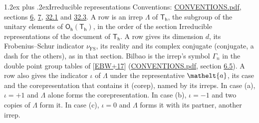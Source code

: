 \documentclass[10pt,a4paper]{article}
\makeatletter
\renewcommand\section{\@startsection{section}{1}{\z@}{-3ex plus -1ex minus -.2ex}%
  {1.2ex plus .2ex}{\normalfont\large\sffamily\bfseries\color{parttitle}}}
\numberwithin{equation}{section}
\newcommand{\eltfont}[1]{{\let\sigma\eltsigma\mathelt{#1}}}
\newcommand{\grp}[1]{\mathsf{#1}}
\newcommand{\elt}[1]{\eltfont{#1}}
\newcommand{\fsind}{\nu_{\mathrm{FS}}}
\makeatother
\begin{document}
\section{Irreducible representations}\label{s:irreps}
Conventions: \href{../../CONVENTIONS.pdf}{CONVENTIONS.pdf}, sections \href{../../../rotation/CONVENTIONS.pdf\#conv.6}{6}, \href{../../../rotation/CONVENTIONS.pdf\#conv.7}{7}, \href{../../CONVENTIONS.pdf\#conv.32.1}{32.1} and \href{../../CONVENTIONS.pdf\#conv.32.3}{32.3}.
\leavevmode\label{n:irrep.Delta}A row is an irrep $\Lambda$ of $\grp{T_{h}}$, the subgroup of the unitary elements of $\grp{O_{h}}(\grp{T_{h}})$, in the order of the section Irreducible representations of the document of \href{../../../rotation/data/pdf/Th.pdf}{$\grp{T_{h}}$}. \label{n:index.dimension}\label{n:index.frobenius}\label{n:head.irrep}\label{n:head.reality}\label{n:head.conjugate}A row gives its dimension $d$, its Frobenius--Schur indicator $\fsind$, its reality and its complex conjugate (conjugate, a dash for the others), as in that section. \label{n:head.bilbao}\label{n:irrep.alias.gamma}Bilbao is the irrep's symbol $\Gamma_n$ in the double point group tables of [\href{../../../REFERENCES.pdf\#ref.EBW+17}{EBW+17}] (\href{../../CONVENTIONS.pdf}{CONVENTIONS.pdf}, section \href{../../../rotation/CONVENTIONS.pdf\#conv.6.5}{6.5}). \label{n:head.case.corep}\label{n:head.corep}A row also gives the indicator $\iota$ of $\Lambda$ under the representative $\elt{a}$, its case and the corepresentation that contains it (corep), named by its irreps. In case (a), $\iota = +1$ and $\Lambda$ alone forms the corepresentation. In case (b), $\iota = -1$ and two copies of $\Lambda$ form it. In case (c), $\iota = 0$ and $\Lambda$ forms it with its partner, another irrep.
\setlength{\emergencystretch}{2em}\par\setlength{\emergencystretch}{0pt}
\end{document}
